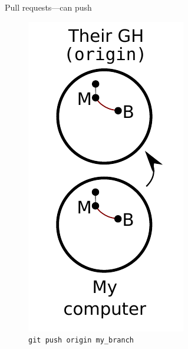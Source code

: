 \begin{frame}{Pull requests---can push}
  \begin{figure}
    \includegraphics{push_004.pdf}
    \\ \texttt{git push origin my\_branch}
    \\ \texttt{}
  \end{figure}
\end{frame}

